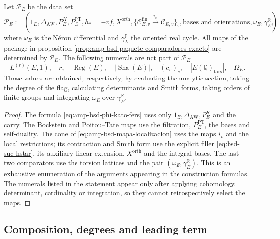 \begin{lemma}
\label{lem:amp-bsd-independencia-termino-principal}
Let \(\mathscr P_E\) be the data set
\begin{equation}\label{eq:amp-bsd-primitivas-paquete}
 \mathscr P_E:=
 \left(
  1_E,\Delta_{\mathrm{AW}},P_E^K,P_E^{\mathrm{PT}},
  h_*=-vf,X^{\mathrm{orth}},
  \{\mathcal C_{E,v}^{\mathrm{fin}}\xrightarrow{i_v}
     \mathcal C_{E,v}\}_v,
  \text{bases and orientations},
  \omega_E,\gamma_E^{\mathbb R}
 \right),
\end{equation}
where \(\omega_E\) is the Néron differential and
\(\gamma_E^{\mathbb R}\) the oriented real cycle. All maps of the
package in proposition
\ref{prop:amp-bsd-paquete-comparadores-exacto} are determined by
\(\mathscr P_E\). The following numerals are not part of \(\mathscr P_E\)
\[
 L^{(r)}(E,1),\quad r,\quad\operatorname{Reg}(E),\quad
 |\operatorname{Sha}(E)|,\quad(c_v)_v,\quad
 |E(\mathbb Q)_{\mathrm{tors}}|,\quad\Omega_E.
\]
Those values are obtained, respectively, by evaluating the analytic section,
taking the degree of the flag, calculating determinants and Smith forms,
taking orders of finite groups and integrating
\(\omega_E\) over \(\gamma_E^{\mathbb R}\).
\end{lemma}

\begin{proof}
The formula \eqref{eq:amp-bsd-phi-kato-fers} uses only
\(1_E,\Delta_{\mathrm{AW}},P_E^K\) and the carry. The Bockstein and
Poitou--Tate maps use the filtration, \(P_E^{\mathrm{PT}}\), the bases and
self-duality. The cone of \eqref{eq:amp-bsd-mapa-localizacion} uses the
maps \(i_v\) and the local restrictions; its contraction and Smith
form use the explicit filler \eqref{eq:bsd-suc-hstar}, its auxiliary linear
extension, \(X^{\mathrm{orth}}\) and the integral bases. The last
two comparators use the torsion lattices and the
pair \((\omega_E,\gamma_E^{\mathbb R})\). This is an exhaustive enumeration
of the arguments appearing in the construction formulas. The
numerals listed in the statement appear only after applying
cohomology, determinant, cardinality or integration, so they cannot
retrospectively select the maps.
\end{proof}

\subsection{Composition, degrees and leading term}
\label{subsec:amp-bsd-composicion}

